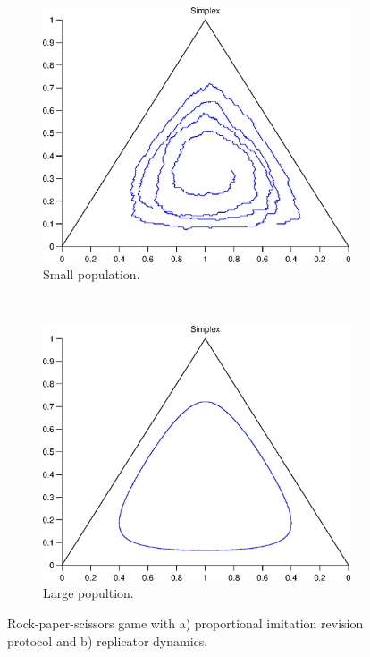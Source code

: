 \begin{figure}[th]
  \centering
  \begin{subfigure}[b]{0.4\textwidth}
	  \includegraphics[width=\textwidth]{./images/test_finite_proportional_imitation.eps}
	  \caption{Small population.}
	  \label{fig:finite1_protocol}
  \end{subfigure}
  ~ 
  \begin{subfigure}[b]{0.4\textwidth}
	  \includegraphics[width=\textwidth]{./images/test1_simplex_rd.eps}
	  \caption{Large popultion.}
	  \label{fig:finite1_dynamics}
  \end{subfigure}
  \caption{Rock-paper-scissors game with a) proportional imitation revision protocol and b) replicator dynamics.}
  \label{fig:finite1}
\end{figure}


